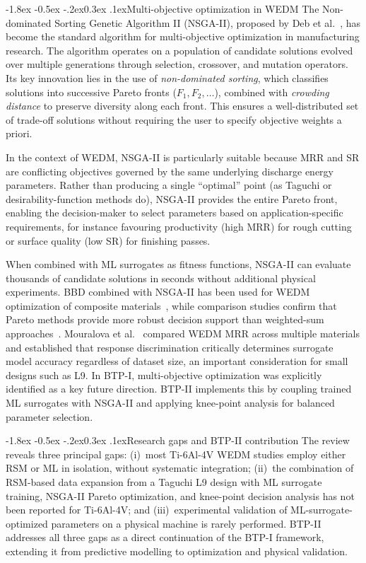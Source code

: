 \documentclass[12pt, a4paper]{report}
\makeatletter
\renewcommand{\section}{\@startsection{section}{1}{\z@}%
  {-1.8ex \@plus -0.5ex \@minus -.2ex}{0.3ex \@plus.1ex}{\normalfont\bfseries}}
\makeatother
\begin{document}
\section{Multi-objective optimization in WEDM}
The Non-dominated Sorting Genetic Algorithm II (NSGA-II), proposed by Deb et al.~\cite{Deb2002}, has become the standard algorithm for multi-objective optimization in manufacturing research. The algorithm operates on a population of candidate solutions evolved over multiple generations through selection, crossover, and mutation operators. Its key innovation lies in the use of \emph{non-dominated sorting}, which classifies solutions into successive Pareto fronts ($F_1, F_2, \ldots$), combined with \emph{crowding distance} to preserve diversity along each front. This ensures a well-distributed set of trade-off solutions without requiring the user to specify objective weights a priori.

In the context of WEDM, NSGA-II is particularly suitable because MRR and SR are conflicting objectives governed by the same underlying discharge energy parameters. Rather than producing a single ``optimal'' point (as Taguchi or desirability-function methods do), NSGA-II provides the entire Pareto front, enabling the decision-maker to select parameters based on application-specific requirements, for instance favouring productivity (high MRR) for rough cutting or surface quality (low SR) for finishing passes.

When combined with ML surrogates as fitness functions, NSGA-II can evaluate thousands of candidate solutions in seconds without additional physical experiments. BBD combined with NSGA-II has been used for WEDM optimization of composite materials~\cite{BBDNSGA2024}, while comparison studies confirm that Pareto methods provide more robust decision support than weighted-sum approaches~\cite{ComparisonWEDM2022}. Mouralova et al.~\cite{Mouralova2024} compared WEDM MRR across multiple materials and established that response discrimination critically determines surrogate model accuracy regardless of dataset size, an important consideration for small designs such as L9. In BTP-I, multi-objective optimization was explicitly identified as a key future direction. BTP-II implements this by coupling trained ML surrogates with NSGA-II and applying knee-point analysis for balanced parameter selection.

\section{Research gaps and BTP-II contribution}
The review reveals three principal gaps: (i)~most Ti-6Al-4V WEDM studies employ either RSM or ML in isolation, without systematic integration; (ii)~the combination of RSM-based data expansion from a Taguchi L9 design with ML surrogate training, NSGA-II Pareto optimization, and knee-point decision analysis has not been reported for Ti-6Al-4V; and (iii)~experimental validation of ML-surrogate-optimized parameters on a physical machine is rarely performed. BTP-II addresses all three gaps as a direct continuation of the BTP-I framework, extending it from predictive modelling to optimization and physical validation.
\end{document}

